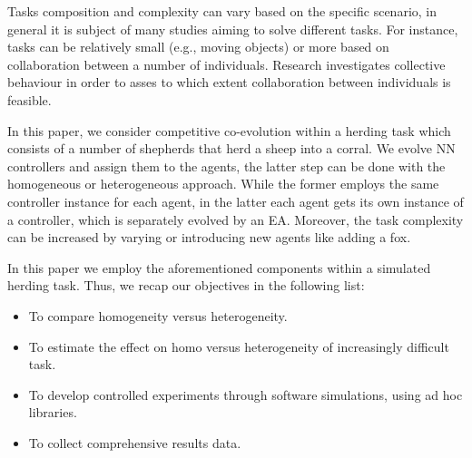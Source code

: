 \documentclass[conference]{IEEEtran}
\begin{document}
Tasks composition and complexity can vary based on the specific scenario, in general it is subject of many studies aiming to solve different tasks.
For instance, tasks can be relatively small (e.g., moving objects) or more based on collaboration between a number of individuals.
Research investigates collective behaviour in order to asses to which extent collaboration between individuals is feasible.  

In this paper, we consider competitive co-evolution within a herding task which consists of a number of shepherds that herd a sheep into a corral.
We evolve NN controllers and assign them to the agents, the latter step can be done with the homogeneous or heterogeneous approach.
While the former employs the same controller instance for each agent, 
in the latter each agent gets its own instance of a controller, which is separately evolved by an EA.
Moreover, the task complexity can be increased by varying or introducing new agents like adding a fox.

In this paper we employ the aforementioned components within a simulated herding task.
Thus, we recap our objectives in the following list:

\begin{itemize}
	\item To compare homogeneity versus heterogeneity.
	\item To estimate the effect on homo versus heterogeneity of increasingly difficult task.
 	\item To develop controlled experiments through software simulations, using ad hoc libraries.
	\item To collect comprehensive results data.
\end{itemize}
 
\end{document}
